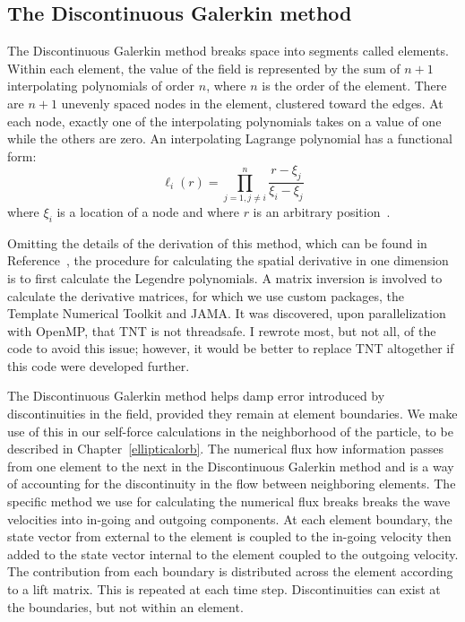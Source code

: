 \subsection{The Discontinuous Galerkin method}
The Discontinuous Galerkin method breaks space into segments called elements. Within each element, the value of the field is represented by the sum of $n+1$ interpolating polynomials of order $n$, where $n$ is the order of the element. There are $n+1$ unevenly spaced nodes in the element, clustered toward the edges. At each node, exactly one of the interpolating polynomials takes on a value of one while the others are zero. An interpolating Lagrange polynomial has a functional form:
\begin{equation}
  \ell_i(r)=\prod_{j=1,j\ne i}^{n}\frac{r-\xi_j}{\xi_i-\xi_j}
\end{equation}
where $\xi_i$ is a location of a node and where $r$ is an arbitrary position~\cite{dghesthaven}. 


Omitting the details of the derivation of this method, which can be found in Reference~\cite{dghesthaven}, the procedure for calculating the spatial derivative in one dimension is to first calculate the Legendre polynomials. A matrix inversion is involved to calculate the derivative matrices, for which we use custom packages, the Template Numerical Toolkit and JAMA. It was discovered, upon parallelization with OpenMP, that TNT is not threadsafe. I rewrote most, but not all, of the code to avoid this issue; however, it would be better to replace TNT altogether if this code were developed further.

The Discontinuous Galerkin method helps damp error introduced by discontinuities in the field, provided they remain at element boundaries. We make use of this in our self-force calculations in the neighborhood of the particle, to be described in Chapter~\ref{ellipticalorb}. The numerical flux how information passes from one element to the next in the Discontinuous Galerkin method and is a way of accounting for the discontinuity in the flow between neighboring elements. The specific method we use for calculating the numerical flux breaks breaks the wave velocities into in-going and outgoing components. At each element boundary, the state vector from external to the element is coupled to the in-going velocity then added to the state vector internal to the element coupled to the outgoing velocity. The contribution from each boundary is distributed across the element according to a lift matrix. This is repeated at each time step. Discontinuities can exist at the boundaries, but not within an element. 



